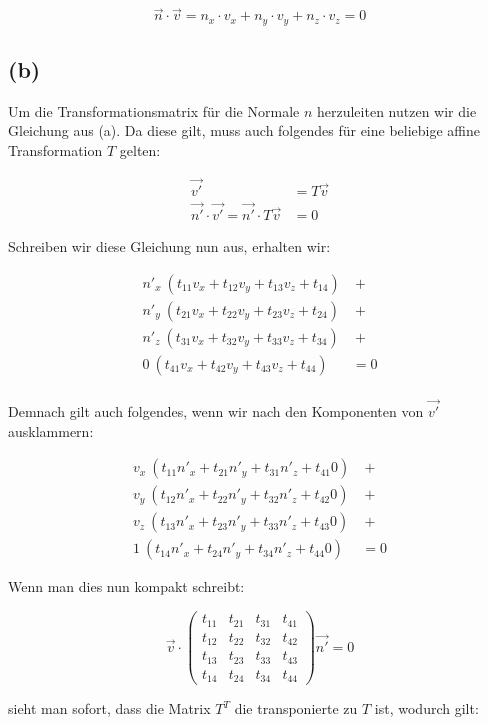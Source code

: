 \documentclass[12pt]{scrreprt}
\begin{document}
\[
	\vec{n} \cdot \vec{v} = n_x \cdot v_x + n_y \cdot v_y + n_z \cdot v_z = 0
\] 
\subsection*{(b)}
Um die Transformationsmatrix für die Normale $n$ herzuleiten nutzen wir die Gleichung aus (a). Da diese gilt, muss auch folgendes für eine beliebige affine Transformation $T$ gelten:

\begin{align*}
	\vec{v'} &= T \vec{v}\\
	\vec{n'} \cdot \vec{v'} = \vec{n'} \cdot T \vec{v} &= 0 
\end{align*}

Schreiben wir diese Gleichung nun aus, erhalten wir:

\begin{align*}
	n'_x~ (t_{11} v_x + t_{12} v_y + t_{13} v_z + t_{14}) &~+\\
	n'_y~ (t_{21} v_x + t_{22} v_y + t_{23} v_z + t_{24}) &~+\\
	n'_z~ (t_{31} v_x + t_{32} v_y + t_{33} v_z + t_{34}) &~+\\
	0~ (t_{41} v_x + t_{42} v_y + t_{43} v_z + t_{44}) &= 0\\
\end{align*}

Demnach gilt auch folgendes, wenn wir nach den Komponenten von $\vec{v'}$ ausklammern:

\begin{align*}
	v_x~(t_{11} n'_x + t_{21} n'_y + t_{31} n'_z + t_{41} 0 ) &~+\\
	v_y~(t_{12} n'_x + t_{22} n'_y + t_{32} n'_z + t_{42} 0) &~+\\
	v_z~(t_{13} n'_x + t_{23} n'_y + t_{33} n'_z + t_{43} 0) &~+\\
	1~(t_{14} n'_x + t_{24} n'_y + t_{34} n'_z + t_{44} 0) &= 0
\end{align*}

Wenn man dies nun kompakt schreibt:

\[
	\vec{v} \cdot
	\begin{pmatrix}
		t_{11} & t_{21} & t_{31} & t_{41}\\
		t_{12} & t_{22} & t_{32} & t_{42}\\
		t_{13} & t_{23} & t_{33} & t_{43}\\
		t_{14} & t_{24} & t_{34} & t_{44}
	\end{pmatrix}
	\vec{n'} = 0
\]

sieht man sofort, dass die Matrix $T^T$ die transponierte zu $T$ ist, wodurch gilt:
\end{document}
